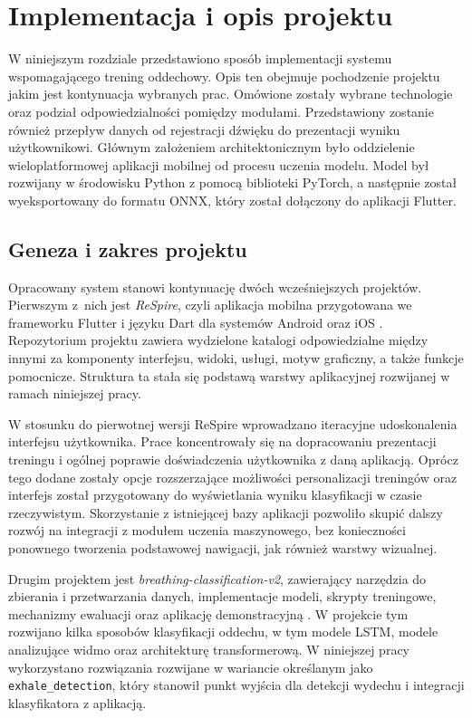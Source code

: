 \chapter{Implementacja i opis projektu}

W niniejszym rozdziale przedstawiono sposób implementacji systemu wspomagającego trening oddechowy. Opis ten  obejmuje pochodzenie projektu jakim jest kontynuacja wybranych prac. Omówione zostały wybrane technologie oraz podział odpowiedzialności pomiędzy modułami. Przedstawiony zostanie również przepływ danych od rejestracji dźwięku do prezentacji wyniku użytkownikowi. Głównym założeniem architektonicznym było oddzielenie wieloplatformowej aplikacji mobilnej od procesu uczenia modelu. Model był rozwijany w środowisku Python z pomocą biblioteki PyTorch, a następnie został wyeksportowany do formatu ONNX, który został dołączony do aplikacji Flutter.

\section{Geneza i zakres projektu}

Opracowany system stanowi kontynuację dwóch wcześniejszych projektów. Pierwszym z~nich jest \textit{ReSpire}, czyli aplikacja mobilna przygotowana we frameworku Flutter i języku Dart dla systemów Android oraz iOS \cite{respireGithub2026}. Repozytorium projektu zawiera wydzielone katalogi odpowiedzialne między innymi za komponenty interfejsu, widoki, usługi, motyw graficzny, a także funkcje pomocnicze. Struktura ta stała się podstawą warstwy aplikacyjnej rozwijanej w ramach niniejszej pracy.

W stosunku do pierwotnej wersji ReSpire wprowadzano iteracyjne udoskonalenia interfejsu użytkownika. Prace koncentrowały się na dopracowaniu prezentacji treningu i ogólnej poprawie doświadczenia użytkownika z daną aplikacją.  Oprócz tego dodane zostały opcje rozszerzające możliwości personalizacji treningów oraz interfejs został przygotowany do wyświetlania wyniku klasyfikacji w czasie rzeczywistym. Skorzystanie z istniejącej bazy aplikacji pozwoliło skupić dalszy rozwój na integracji z modułem uczenia maszynowego, bez konieczności ponownego tworzenia podstawowej nawigacji, jak również warstwy wizualnej.

Drugim projektem jest \textit{breathing-classification-v2}, zawierający narzędzia do zbierania i przetwarzania danych, implementacje modeli, skrypty treningowe, mechanizmy ewaluacji oraz aplikację demonstracyjną \cite{breathingClassificationGithub2026}. W projekcie tym rozwijano kilka sposobów klasyfikacji oddechu, w tym modele LSTM, modele analizujące widmo oraz architekturę transformerową. W niniejszej pracy wykorzystano rozwiązania rozwijane w wariancie określanym jako \texttt{exhale\_detection}, który stanowił punkt wyjścia dla detekcji wydechu i integracji klasyfikatora z aplikacją.

